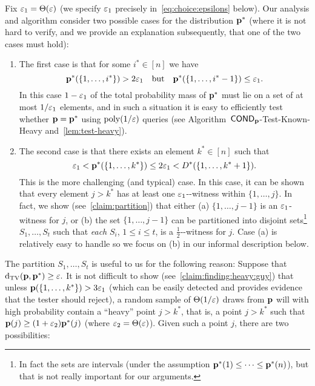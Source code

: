 Fix $\varepsilon_1 = \Theta(\varepsilon)$ (we specify ${\varepsilon_1}$ precisely in~\cref{eq:choice:epsilons} below).
Our analysis and algorithm consider two possible cases for the distribution $\mathbf{p}^\ast$
(where it is not hard to verify, and we provide an explanation subsequently, that one of the two cases must hold):

\begin{enumerate}
\item The first case is that for some $i^\ast \in [n]$ we have
\begin{equation} \label{eq:gap}
\mathbf{p}^\ast(\{1,\dots,i^\ast\}) > 2 {\varepsilon_1} \quad \text{but} \quad \mathbf{p}^\ast(\{1,\dots,i^\ast-1\}) \leq \varepsilon_1.
\end{equation}
In this case $1-{\varepsilon_1}$ of the total probability mass of $\mathbf{p}^\ast$
must lie on a set of at most $1/{\varepsilon_1}$ elements, and in such a situation it is
easy to efficiently test whether $\mathbf{p} = \mathbf{p}^\ast$
using $\operatorname*{poly}(1/\varepsilon)$ queries (see Algorithm~{\sc ${\sf COND}_{\mathbf{p}}$-Test-Known-Heavy} and~\cref{lem:test-heavy}).

\item The second case is that there exists an element $k^\ast \in [n]$ such that
\begin{equation} \label{eq:nogap}
{\eps_1} < \D^\ast(\{1,\dots,k^\ast\}) \leq 2{\eps_1} <
D^\ast(\{1,\dots,k^\ast + 1\}).
\end{equation}
This is the more challenging (and typical) case.
In this case, it can be shown
that every element $j > k^\ast$ has at least one ${\varepsilon_1}$-\good-witness
within $\{1,\dots,j\}.$
In fact, we show (see~\cref{claim:partition}) that
either (a) $\{1,\dots,j-1\}$ is an ${\varepsilon_1}$-\good witness for $j$, or (b) the
set $\{1,\dots,j-1\}$ can be partitioned
into disjoint sets\footnote{In fact the sets are intervals (under the assumption
\mbox{$\mathbf{p}^\ast(1)\leq\dots\leq\mathbf{p}^\ast(n)$}),
but that is not really important for our arguments.}
$S_1,\dots,S_t$
such that \emph{each} $S_i$, $1 \leq i \leq t$, is a ${\frac{1}2}$-\good-witness for $j$.
Case (a) is relatively easy to handle so we focus on (b) in our informal description below.
\end{enumerate}

The partition $S_1,\dots,S_t$ is useful to us for the following reason:  Suppose that
$\operatorname{d}_{\textrm{TV}}(\mathbf{p},\mathbf{p}^\ast) \geq \varepsilon.$  It is not difficult to show (see~\cref{claim:finding:heavy:guy}) that 
unless $\mathbf{p}(\{1,\dots,k^\ast\}) > 3 {\varepsilon_1}$ (which can be easily detected and provides evidence that the tester should reject), a random sample of {$\Theta(1/\varepsilon)$} draws from $\mathbf{p}$ will with high probability contain a ``heavy'' point $j > k^\ast$, that is, a point $j > k^\ast$ such that $\mathbf{p}(j) \geq (1+{\varepsilon_2})\mathbf{p}^\ast(j)$ (where ${\varepsilon_2} = \Theta(\varepsilon)$).  Given such a point $j$, there are two possibilities:

